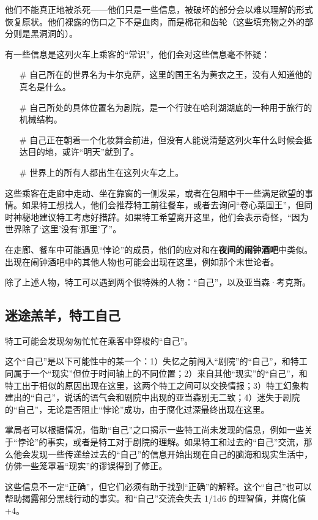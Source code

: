 他们不能真正地被杀死——他们只是一些信息，被破坏的部分会以难以理解的形式恢复原状。他们裸露的伤口之下不是血肉，而是棉花和齿轮（这些填充物之外的部分则是黑洞洞的）。

有一些信息是这列火车上乘客的“常识”，他们会对这些信息毫不怀疑：
\begin{itemize}
    \item[\#] 自己所在的世界名为卡尔克萨，这里的国王名为黄衣之王，没有人知道他的真名是什么。
    \item[\#] 自己所处的具体位置名为剧院，是一个行驶在哈利湖湖底的一种用于旅行的机械结构。
    \item[\#] 自己正在朝着一个化妆舞会前进，但没有人能说清楚这列火车什么时候会抵达目的地，或许“明天”就到了。
    \item[\#] 世界上的所有人都出生在这列火车之上。 
\end{itemize}

这些乘客在走廊中走动、坐在靠窗的一侧发呆，或者在包厢中干一些满足欲望的事情。如果特工想找人，他们会推荐特工前往餐车，或者去询问“卷心菜国王”，但同时神秘地建议特工考虑好措辞。如果特工希望离开这里，他们会表示奇怪，“因为世界除了‘这里’没有‘那里’了”。

在走廊、餐车中可能遇见“悖论”的成员，他们的应对和在\textbf{夜间的闹钟酒吧}中类似。出现在闹钟酒吧中的其他人物也可能会出现在这里，例如那个末世论者。

除了上述人物，特工可以遇到两个很特殊的人物：“自己”，以及亚当森·考克斯。

\subsection{迷途羔羊，特工自己}
特工可能会发现匆匆忙忙在乘客中穿梭的“自己”。

这个“自己”是以下可能性中的某一个：1）失忆之前闯入“剧院”的“自己”，和特工同属于一个“现实”但位于时间轴上的不同位置；2）来自其他“现实”的“自己”，和特工出于相似的原因出现在这里，这两个特工之间可以交换情报；3）特工幻象构建出的“自己”，说话的语气会和剧院中出现的亚当森别无二致；4）迷失于剧院的“自己”，无论是否阻止“悖论”成功，由于腐化过深最终出现在这里。

掌局者可以根据情况，借助“自己”之口揭示一些特工尚未发现的信息，例如一些关于“悖论”的事实，或者是特工对于剧院的理解。如果特工和过去的“自己”交流，那么他会发现一些传递给过去的“自己”的信息开始出现在自己的脑海和现实生活中，仿佛一些笼罩着“现实”的谬误得到了修正。

这些信息不一定“正确”，但它们必须有助于找到“正确”的解释。这个“自己”也可以帮助揭露部分黑线行动的事实。和“自己”交流会失去 1/1d6 的理智值，并腐化值+4。

